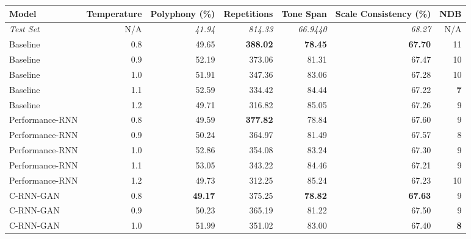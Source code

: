 \documentclass[a4paper]{book}
\begin{document}
\begin{landscape}
\begin{table}[t]
    \centering
\begin{tabular}{l|r|r|r|r|r|r}
    Model             & Temperature & Polyphony (\%)  & Repetitions       & Tone Span        & Scale Consistency (\%) & NDB     \\ \hline
\textit{Test Set} & N/A         & \textit{41.94} & \textit{814.33} & \textit{66.9440} & \textit{68.27}   & N/A     \\
Baseline          & 0.8         & 49.65          & \textbf{\color{base0D}388.02}    & \textbf{\color{base0D}78.45}          & \textbf{\color{base0D}67.70}            & 11      \\
Baseline          & 0.9         & 52.19          & 373.06          & 81.31          & 67.47            & 10      \\
Baseline          & 1.0         & 51.91          & 347.36          & 83.06          & 67.28            & 10      \\
Baseline          & 1.1         & 52.59          & 334.42          & 84.44          & 67.22            & \textbf{\color{base0D}7} \\
Baseline          & 1.2         & 49.71          & 316.82          & 85.05          & 67.26            & 9       \\
Performance-RNN   & 0.8         & 49.59          & \textbf{\color{base0A}377.82}          & 78.84          & 67.60            & 9       \\
Performance-RNN   & 0.9         & 50.24          & 364.97          & 81.49          & 67.57            & 8       \\
Performance-RNN   & 1.0         & 52.86          & 354.08          & 83.24          & 67.30            & 9       \\
Performance-RNN   & 1.1         & 53.05          & 343.22          & 84.46          & 67.21            & 9       \\
Performance-RNN   & 1.2         & 49.73          & 312.25          & 85.24          & 67.23            & 10      \\
C-RNN-GAN         & 0.8         & \textbf{\color{base0E}49.17}    & 375.25          & \textbf{\color{base0A}78.82}    & \textbf{\color{base0A}67.63}      & 9       \\
C-RNN-GAN         & 0.9         & 50.23          & 365.19          & 81.22          & 67.50            & 9       \\
C-RNN-GAN         & 1.0         & 51.99          & 351.02          & 83.00          & 67.40            & \textbf{\color{base0A}8}       \\

\end{tabular}
\end{table}
\end{landscape}
\end{document}
